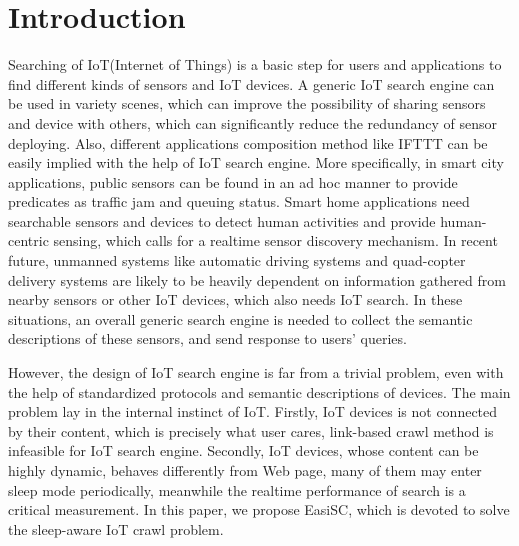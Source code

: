 \documentclass[conference]{IEEEtran}
\begin{document}
\IEEEpeerreviewmaketitle

\section{Introduction}
Searching of IoT(Internet of Things) is a basic step for users and applications to find different kinds of sensors and IoT devices. 
A generic IoT search engine can be used in variety scenes, which can improve the possibility of sharing sensors and device with others, which can significantly reduce the redundancy of sensor deploying. Also, different applications composition method like IFTTT\cite{ifttt} can be easily implied with the help of IoT search engine.
More specifically, in smart city applications, public sensors can be found in an ad hoc manner to provide predicates as traffic jam and queuing status. 
Smart home applications need searchable sensors and devices to detect human activities and provide human-centric sensing, which calls for a realtime sensor discovery mechanism. In recent future, unmanned systems like automatic driving systems and quad-copter delivery systems are likely to be heavily dependent on information gathered from nearby sensors or other IoT devices, which also needs IoT search. In these situations, an overall generic search engine is needed to collect the semantic descriptions of these sensors, and send response to users' queries. 


However, the design of IoT search engine is far from a trivial problem, even with the help of standardized protocols and semantic descriptions of devices. The main problem lay in the internal instinct of IoT. Firstly, IoT devices is not connected by their content, which is precisely what user cares, link-based crawl method is infeasible for IoT search engine. Secondly, IoT devices, whose content can be highly dynamic, behaves differently from Web page, many of them may enter sleep mode periodically, meanwhile the realtime performance of search is a critical measurement. In this paper, we propose EasiSC, which is devoted to solve the sleep-aware IoT crawl problem.
\end{document}
